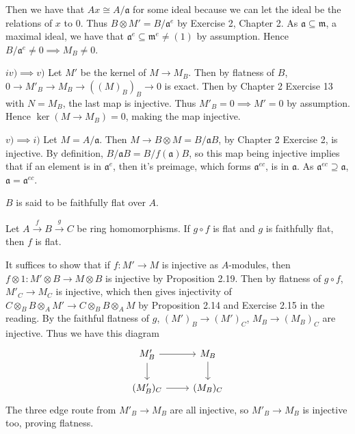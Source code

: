 \begin{questions}
\begin{solution}
	Then we have that $Ax \cong A / \mathfrak{a} $ for some ideal because we can let the ideal be the relations of $x $ to 0.
	Thus $B \otimes M' = B / \mathfrak{a}^e $ by Exercise 2, Chapter 2.
	As $\mathfrak{a}\subseteq \mathfrak{m} $, a maximal ideal, we have that $\mathfrak{a}^e \subseteq \mathfrak{m}^e \ne (1) $ by assumption.
	Hence $B / \mathfrak{a}^e \ne 0 \implies M_B \ne 0$.

	$iv) \implies v) $ Let $M' $ be the kernel of $M \to M_B $.
	Then by flatness of $B $, $0\to M'_B \to M_B \to ((M)_B)_B \to 0 $ is exact.
	Then by Chapter 2 Exercise 13 with $N = M_B $, the last map is injective.
	Thus $M'_B = 0 \implies M' = 0 $ by assumption.
	Hence $\ker (M\to M_B) = 0 $, making the map injective.

	$v)\implies i) $ Let $M = A / \mathfrak{a} $.
	Then $M \to B \otimes M = B / \mathfrak{a}B $, by Chapter 2 Exercise 2, is injective.
	By definition, $B / \mathfrak{a}B = B / f(\mathfrak{a})B $, so this map being injective implies that if an element is in $\mathfrak{a}^e $, then it's preimage, which forms $\mathfrak{a}^{ec} $, is in $\mathfrak{a} $.
	As $\mathfrak{a}^{ec} \supseteq \mathfrak{a} $, $\mathfrak{a} = \mathfrak{a}^{ec} $.
\end{solution}
$B $ is said to be faithfully flat over $A $.

\question Let $A\xrightarrow{f} B \xrightarrow{g} C $ be ring homomorphisms. If $g\circ f $ is flat and $g $ is faithfully flat, then $f $ is flat.
\begin{solution}
	It suffices to show that if $f: M'\to M$ is injective as $A $-modules, then $f \otimes 1: M' \otimes B\to M \otimes B $ is injective by Proposition 2.19.
	Then by flatness of $g\circ f $, $M'_C \to M_C$ is injective, which then gives injectivity of $C \otimes _B B \otimes _A M' \to C \otimes _B B \otimes_A M$ by Proposition 2.14 and Exercise 2.15 in the reading.
	By the faithful flatness of $g $, $(M')_B \to (M')_C $, $M_B\to (M_B)_C $ are injective.
	Thus we have this diagram
	\[
	\begin{tikzcd}
	 M'_B & M_B\\
	 (M'_B)_C & (M_B)_C
	\arrow[from=1-1,to=1-2]
	\arrow[from=1-1,to=2-1]
	\arrow[from=2-1,to=2-2]
	\arrow[from=1-2,to=2-2]
	\end{tikzcd}
	\]
	The three edge route from $M'_B\to M_B $ are all injective, so $M'_B\to M_B $ is injective too, proving flatness.
\end{solution}


\end{questions}
